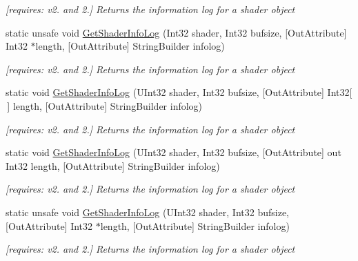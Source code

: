 \begin{DoxyCompactItemize}
\begin{DoxyCompactList}\small\item\em \mbox{[}requires\-: v2. and 2.\mbox{]} Returns the information log for a shader object \end{DoxyCompactList}\item 
static unsafe void \hyperlink{class_open_t_k_1_1_graphics_1_1_e_s20_1_1_g_l_a2835f8e52fbf90c31ae9d9d56c504b97}{Get\-Shader\-Info\-Log} (Int32 shader, Int32 bufsize, \mbox{[}Out\-Attribute\mbox{]} Int32 $\ast$length, \mbox{[}Out\-Attribute\mbox{]} String\-Builder infolog)
\begin{DoxyCompactList}\small\item\em \mbox{[}requires\-: v2. and 2.\mbox{]} Returns the information log for a shader object \end{DoxyCompactList}\item 
static void \hyperlink{class_open_t_k_1_1_graphics_1_1_e_s20_1_1_g_l_ac47f474f647fe6790f1b523e0b7f0055}{Get\-Shader\-Info\-Log} (U\-Int32 shader, Int32 bufsize, \mbox{[}Out\-Attribute\mbox{]} Int32\mbox{[}$\,$\mbox{]} length, \mbox{[}Out\-Attribute\mbox{]} String\-Builder infolog)
\begin{DoxyCompactList}\small\item\em \mbox{[}requires\-: v2. and 2.\mbox{]} Returns the information log for a shader object \end{DoxyCompactList}\item 
static void \hyperlink{class_open_t_k_1_1_graphics_1_1_e_s20_1_1_g_l_a06ff28683fb52f7f2cd8725a9a0eebcd}{Get\-Shader\-Info\-Log} (U\-Int32 shader, Int32 bufsize, \mbox{[}Out\-Attribute\mbox{]} out Int32 length, \mbox{[}Out\-Attribute\mbox{]} String\-Builder infolog)
\begin{DoxyCompactList}\small\item\em \mbox{[}requires\-: v2. and 2.\mbox{]} Returns the information log for a shader object \end{DoxyCompactList}\item 
static unsafe void \hyperlink{class_open_t_k_1_1_graphics_1_1_e_s20_1_1_g_l_a202c170d8633cb3acdf5ac6040e30ca9}{Get\-Shader\-Info\-Log} (U\-Int32 shader, Int32 bufsize, \mbox{[}Out\-Attribute\mbox{]} Int32 $\ast$length, \mbox{[}Out\-Attribute\mbox{]} String\-Builder infolog)
\begin{DoxyCompactList}\small\item\em \mbox{[}requires\-: v2. and 2.\mbox{]} Returns the information log for a shader object \end{DoxyCompactList}\item 

\end{DoxyCompactItemize}
